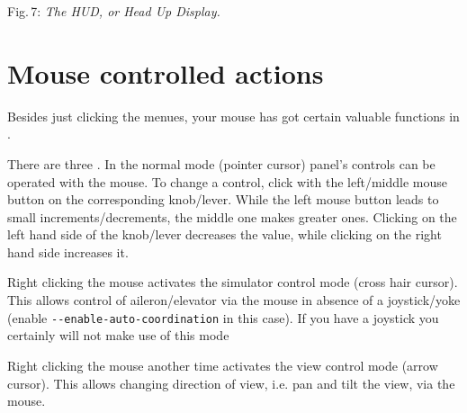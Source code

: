 \medskip

 \centerline{}

\smallskip
 \noindent
Fig.\,7: \textit{The HUD, or Head Up Display.}
\medskip

\section{Mouse controlled actions}

Besides just clicking the menues, your mouse has got certain valuable functions in \FlightGear{}$\!$.


There are three . In the normal mode (pointer cursor) panel's controls can be operated with the mouse. To change a control, click with the left/middle mouse button on the corresponding knob/lever. While the left mouse button leads to small increments/decrements, the middle one makes greater ones. Clicking on the left hand side of the knob/lever decreases the value, while clicking on the right hand side increases
it.

 Right clicking the mouse activates the simulator control mode (cross hair cursor). This allows control of aileron/elevator via the mouse in absence of a joystick/yoke (enable \texttt{-$ $-enable-auto-coordination} in this case). If you have a joystick you certainly will not make use of this mode

 Right clicking the mouse another time activates the view control mode (arrow cursor).
 This allows changing direction of view, i.e. pan and tilt the view, via the mouse.

